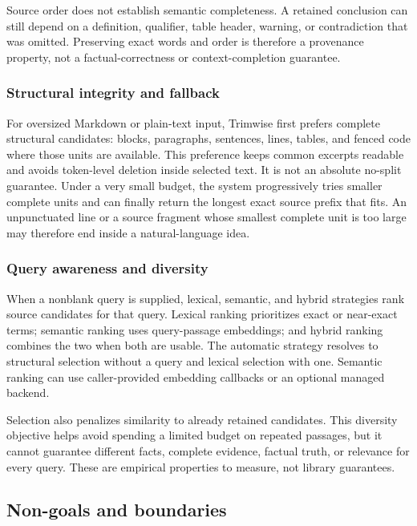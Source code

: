 \documentclass[
]{article}
\begin{document}
Source order does not establish semantic completeness. A retained
conclusion can still depend on a definition, qualifier, table header,
warning, or contradiction that was omitted. Preserving exact words and
order is therefore a provenance property, not a factual-correctness or
context-completion guarantee.

\subsubsection{Structural integrity and
fallback}\label{structural-integrity-and-fallback}

For oversized Markdown or plain-text input, Trimwise first prefers
complete structural candidates: blocks, paragraphs, sentences, lines,
tables, and fenced code where those units are available. This preference
keeps common excerpts readable and avoids token-level deletion inside
selected text. It is not an absolute no-split guarantee. Under a very
small budget, the system progressively tries smaller complete units and
can finally return the longest exact source prefix that fits. An
unpunctuated line or a source fragment whose smallest complete unit is
too large may therefore end inside a natural-language idea.

\subsubsection{Query awareness and
diversity}\label{query-awareness-and-diversity}

When a nonblank query is supplied, lexical, semantic, and hybrid
strategies rank source candidates for that query. Lexical ranking
prioritizes exact or near-exact terms; semantic ranking uses
query-passage embeddings; and hybrid ranking combines the two when both
are usable. The automatic strategy resolves to structural selection
without a query and lexical selection with one. Semantic ranking can use
caller-provided embedding callbacks or an optional managed backend.

Selection also penalizes similarity to already retained candidates. This
diversity objective helps avoid spending a limited budget on repeated
passages, but it cannot guarantee different facts, complete evidence,
factual truth, or relevance for every query. These are empirical
properties to measure, not library guarantees.

\subsection{Non-goals and boundaries}\label{non-goals-and-boundaries}
\end{document}
